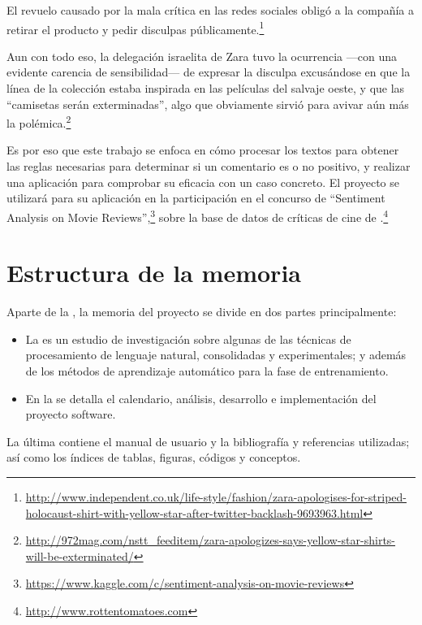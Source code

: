 \begin{example}
El revuelo causado por la mala crítica en las redes sociales obligó a la compañía a retirar el producto y pedir disculpas públicamente.\footnote{\url{http://www.independent.co.uk/life-style/fashion/zara-apologises-for-striped-holocaust-shirt-with-yellow-star-after-twitter-backlash-9693963.html}}

Aun con todo eso, la delegación israelita de Zara tuvo la ocurrencia ---con una evidente carencia de sensibilidad--- de expresar la disculpa excusándose en que la línea de la colección estaba inspirada en las películas del salvaje oeste, y que las ``camisetas serán exterminadas'', algo que obviamente sirvió para avivar aún más la polémica.\footnote{\url{http://972mag.com/nstt_feeditem/zara-apologizes-says-yellow-star-shirts-will-be-exterminated/}}
\end{example}

Es por eso que este trabajo se enfoca en cómo procesar los textos para obtener las reglas necesarias para determinar si un comentario es o no positivo, y realizar una aplicación para comprobar su eficacia con un caso concreto. El proyecto se utilizará para su aplicación en la participación en el concurso de  ``Sentiment Analysis on Movie Reviews'',\footnote{\url{https://www.kaggle.com/c/sentiment-analysis-on-movie-reviews}} sobre la base de datos de críticas de cine de .\footnote{\url{http://www.rottentomatoes.com}}

\section{Estructura de la memoria}

Aparte de la , la memoria del proyecto se divide en dos partes principalmente:
\begin{itemize}
\item La  es un estudio de investigación sobre algunas de las técnicas de procesamiento de lenguaje natural, consolidadas y experimentales; y además de los métodos de aprendizaje automático para la fase de entrenamiento.
\item En la  se detalla el calendario, análisis, desarrollo e implementación del proyecto software.
\end{itemize}

La última  contiene el manual de usuario y la bibliografía y referencias utilizadas; así como los índices de tablas, figuras, códigos y conceptos.
